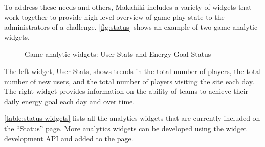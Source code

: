 To address these needs and others, Makahiki includes a variety of widgets that work together to provide high level overview of game play state to the administrators of a challenge. \autoref{fig:status} shows an example of two game analytic widgets.

\begin{figure}[!ht]
  \center
  \caption{Game analytic widgets: User Stats and Energy Goal Status}
  \label{fig:status}
\end{figure}

The left widget, User Stats, shows trends in the total number of players, the total number of new users, and the total number of players visiting the site each day.  The right widget provides information on the ability of teams to achieve their daily energy goal each day and over time.

\autoref{table:status-widgets} lists all the analytics widgets that are currently included on the ``Status'' page. More analytics widgets can be developed using the widget development API and added to the page.

